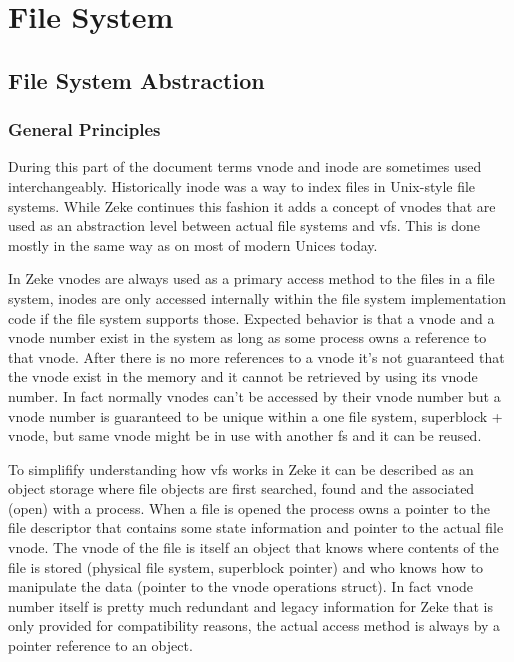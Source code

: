 \part{File System}

\chapter{File System Abstraction}

\section{General Principles}

During this part of the document terms \acs{vnode} and \acs{inode} are
sometimes used interchangeably. Historically inode was a way to index files
in Unix-style file systems.\cite{Wikipedia:inode} While Zeke continues this
fashion it adds a concept of vnodes that are used as an abstraction level
between actual file systems and \acf{vfs}. This is done mostly in the same way
as on most of modern Unices today.

In Zeke vnodes are always used as a primary access method to the files in
a file system, inodes are only accessed internally within the file system
implementation code if the file system supports those. Expected behavior is
that a vnode and a vnode number exist in the system as long as some process owns
a reference to that vnode. After there is no more references to a vnode it's
not guaranteed that the vnode exist in the memory and it cannot be retrieved
by using its vnode number. In fact normally vnodes can't be accessed by their
vnode number but a vnode number is guaranteed to be unique within a one file
system, superblock + vnode, but same vnode might be in use with another fs and
it can be reused.

To simplifify understanding how vfs works in Zeke it can be described as an
object storage where file objects are first searched, found and the associated
(open) with a process. When a file is opened the process owns a pointer to the
file descriptor that contains some state information and pointer to the actual
file vnode. The vnode of the file is itself an object that knows where contents
of the file is stored (physical file system, superblock pointer) and who knows
how to manipulate the data (pointer to the vnode operations struct). In fact
vnode number itself is pretty much redundant and legacy information for Zeke
that is only provided for compatibility reasons, the actual access method is
always by a pointer reference to an object.

